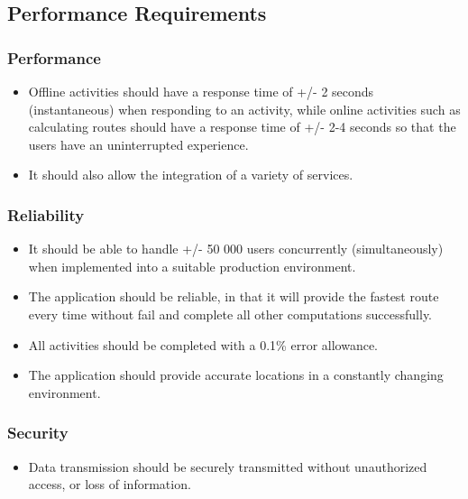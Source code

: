 \documentclass{article}
\begin{document}
		
	\subsection{Performance Requirements}
		\subsubsection{Performance}
			\begin{itemize}
			\item Offline activities should have a response time of +/- 2 seconds (instantaneous) when responding to an activity, while online activities such as calculating routes should have a response time of +/- 2-4 seconds so that the users have an uninterrupted experience.
			\item It should also allow the integration of a variety of services.\\
			\end{itemize}
			\subsubsection{Reliability} 
			\begin{itemize}
			\item It should be able to handle +/- 50 000 users concurrently (simultaneously) when implemented into a suitable production environment. 
			\item The application should be reliable, in that it will provide the fastest route every time without fail and complete all other computations successfully. 
			\item All activities should be completed with a 0.1\% error allowance.
			\item The application should provide accurate locations in a constantly changing environment.\\
			\end{itemize}
			\subsubsection{Security}
			\begin{itemize}
			\item Data transmission should be securely transmitted without unauthorized access, or loss of information.\\
			\end{itemize}

	
	
\end{document}
